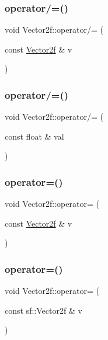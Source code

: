 \subsubsection{\texorpdfstring{operator/=()}{operator/=()}\hspace{0.1cm}{\footnotesize\ttfamily [1/2]}}
{\footnotesize\ttfamily void Vector2f\+::operator/= (\begin{DoxyParamCaption}\item[{const \mbox{\hyperlink{class_vector2f}{Vector2f}} \&}]{v }\end{DoxyParamCaption})}

\mbox{\label{class_vector2f_a57392e8fe0d5d6d2d91b88926543eb6d}} 
\subsubsection{\texorpdfstring{operator/=()}{operator/=()}\hspace{0.1cm}{\footnotesize\ttfamily [2/2]}}
{\footnotesize\ttfamily void Vector2f\+::operator/= (\begin{DoxyParamCaption}\item[{const float \&}]{val }\end{DoxyParamCaption})}

\mbox{\label{class_vector2f_a4df9c7f05922119cb84b8ccd3cbce868}} 
\subsubsection{\texorpdfstring{operator=()}{operator=()}\hspace{0.1cm}{\footnotesize\ttfamily [1/3]}}
{\footnotesize\ttfamily void Vector2f\+::operator= (\begin{DoxyParamCaption}\item[{const \mbox{\hyperlink{class_vector2f}{Vector2f}} \&}]{v }\end{DoxyParamCaption})}

\mbox{\label{class_vector2f_a39c1f54b2f9c0e3840dc5e4888c2cb6b}} 
\subsubsection{\texorpdfstring{operator=()}{operator=()}\hspace{0.1cm}{\footnotesize\ttfamily [2/3]}}
{\footnotesize\ttfamily void Vector2f\+::operator= (\begin{DoxyParamCaption}\item[{const sf\+::\+Vector2f \&}]{v }\end{DoxyParamCaption})}

